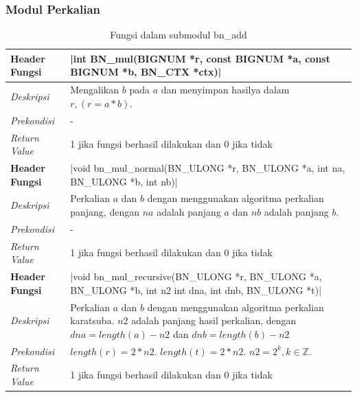 \subsubsection{Modul Perkalian}
\begin{table}[h]
  \caption{Fungsi dalam submodul bn\_add}
  \begin{tabular}{R{2.8cm}L{10.5cm}}
    \toprule
    \textbf{Header Fungsi} & |int BN_mul(BIGNUM *r, const BIGNUM *a, const BIGNUM *b, BN_CTX *ctx)|                                                                                                \\ \midrule
    \textit{Deskripsi}     & Mengalikan $b$ pada $a$ dan menyimpan hasilya dalam $r, (r = a * b)$.                                                                                                 \\
    \textit{Prekondisi}    & -                                                                                                                                                                     \\
    \textit{Return Value}  & 1 jika fungsi berhasil dilakukan dan 0 jika tidak
    \\ \bottomrule
    \textbf{Header Fungsi} & |void bn_mul_normal(BN_ULONG *r, BN_ULONG *a, int na, BN_ULONG *b, int nb)|                                                                                           \\ \midrule
    \textit{Deskripsi}     & Perkalian $a$ dan $b$ dengan menggunakan algoritma perkalian panjang, dengan $na$ adalah panjang $a$ dan $nb$ adalah panjang $b$.                                     \\
    \textit{Prekondisi}    & -                                                                                                                                                                     \\
    \textit{Return Value}  & 1 jika fungsi berhasil dilakukan dan 0 jika tidak
    \\ \bottomrule
    \textbf{Header Fungsi} & |void bn_mul_recursive(BN_ULONG *r, BN_ULONG *a, BN_ULONG *b, int n2 int dna, int dnb, BN_ULONG *t)|                                                                  \\ \midrule
    \textit{Deskripsi}     & Perkalian $a$ dan $b$ dengan menggunakan algoritma perkalian karatsuba. $n2$ adalah panjang hasil perkalian, dengan $dna = length(a) - n2$ dan $dnb = length(b) - n2$ \\
    \textit{Prekondisi}    & $length(r) = 2*n2$. $ length(t) = 2*n2$. $n2 = 2^k, k \in \mathbb{Z}. $                                                                                               \\
    \textit{Return Value}  & 1 jika fungsi berhasil dilakukan dan 0 jika tidak
    \\ \bottomrule
  \end{tabular}

\end{table}

